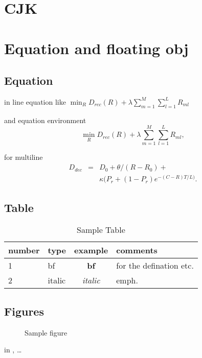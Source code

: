 \documentclass[a4paper,12pt]{article}
\begin{document}
\section{CJK}

\begin{CJK*}{GB}{song}


	{

	}
\end{CJK*}
\section{Equation and floating obj}
\subsection{Equation}

in line equation like
$\min_R D_{rec}(R)+\lambda\sum_{m=1}^{M}%
\sum_{l=1}^{L}R_{ml}$

and equation environment
\begin{equation}
\min_R D_{rec}(R)+\lambda\sum_{m=1}^{M}%
\sum_{l=1}^{L}R_{ml},
\end{equation}

for multiline
\begin{eqnarray}
D_{dec}&=&D_0+\theta/(R-R_0)+ \nonumber\\
       & &\kappa(P_r+(1-P_r)e^{-(C-R)T/L)}.
\label{equ:distort}
\end{eqnarray}

\subsection{Table}

\begin{table}[htb]
\centering
\caption{Sample Table}
\label{tab:sample}
\begin{tabular}{|l|lc|p{5em}|}
\hline
number & type & example & comments \\
\hline
\hline
\hline
1	& bf	&\textbf{bf}	& for the
defination etc.\\
2	& italic&\textit{italic}& emph.\\
\hline
\end{tabular}
\end{table}

\subsection{Figures}

\begin{figure}[htb]
	\begin{center}
	\end{center}
	\caption{Sample figure}
	\label{fig:sample}
\end{figure}
in \cite{bib:ubi91weiser}, \ldots
\end{document}
